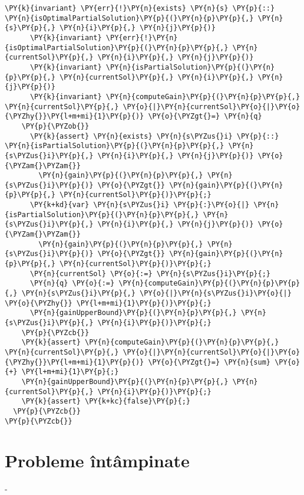 \begin{sloppypar}
\begin{enumerate}
\begin{Verbatim}[commandchars=\\\{\}]
      \PY{k}{invariant} \PY{err}{!}\PY{n}{exists} \PY{n}{s} \PY{p}{::} \PY{n}{isOptimalPartialSolution}\PY{p}{(}\PY{n}{p}\PY{p}{,} \PY{n}{s}\PY{p}{,} \PY{n}{i}\PY{p}{,} \PY{n}{j}\PY{p}{)}
      \PY{k}{invariant} \PY{err}{!}\PY{n}{isOptimalPartialSolution}\PY{p}{(}\PY{n}{p}\PY{p}{,} \PY{n}{currentSol}\PY{p}{,} \PY{n}{i}\PY{p}{,} \PY{n}{j}\PY{p}{)}
      \PY{k}{invariant} \PY{n}{isPartialSolution}\PY{p}{(}\PY{n}{p}\PY{p}{,} \PY{n}{currentSol}\PY{p}{,} \PY{n}{i}\PY{p}{,} \PY{n}{j}\PY{p}{)}
      \PY{k}{invariant} \PY{n}{computeGain}\PY{p}{(}\PY{n}{p}\PY{p}{,} \PY{n}{currentSol}\PY{p}{,} \PY{o}{|}\PY{n}{currentSol}\PY{o}{|}\PY{o}{\PYZhy{}}\PY{l+m+mi}{1}\PY{p}{)} \PY{o}{\PYZgt{}=} \PY{n}{q}
    \PY{p}{\PYZob{}}
      \PY{k}{assert} \PY{n}{exists} \PY{n}{s\PYZus{}i} \PY{p}{::} \PY{n}{isPartialSolution}\PY{p}{(}\PY{n}{p}\PY{p}{,} \PY{n}{s\PYZus{}i}\PY{p}{,} \PY{n}{i}\PY{p}{,} \PY{n}{j}\PY{p}{)} \PY{o}{\PYZam{}\PYZam{}} 
        \PY{n}{gain}\PY{p}{(}\PY{n}{p}\PY{p}{,} \PY{n}{s\PYZus{}i}\PY{p}{)} \PY{o}{\PYZgt{}} \PY{n}{gain}\PY{p}{(}\PY{n}{p}\PY{p}{,} \PY{n}{currentSol}\PY{p}{)}\PY{p}{;}
      \PY{k+kd}{var} \PY{n}{s\PYZus{}i} \PY{p}{:}\PY{o}{|} \PY{n}{isPartialSolution}\PY{p}{(}\PY{n}{p}\PY{p}{,} \PY{n}{s\PYZus{}i}\PY{p}{,} \PY{n}{i}\PY{p}{,} \PY{n}{j}\PY{p}{)} \PY{o}{\PYZam{}\PYZam{}} 
        \PY{n}{gain}\PY{p}{(}\PY{n}{p}\PY{p}{,} \PY{n}{s\PYZus{}i}\PY{p}{)} \PY{o}{\PYZgt{}} \PY{n}{gain}\PY{p}{(}\PY{n}{p}\PY{p}{,} \PY{n}{currentSol}\PY{p}{)}\PY{p}{;}
      \PY{n}{currentSol} \PY{o}{:=} \PY{n}{s\PYZus{}i}\PY{p}{;}
      \PY{n}{q} \PY{o}{:=} \PY{n}{computeGain}\PY{p}{(}\PY{n}{p}\PY{p}{,} \PY{n}{s\PYZus{}i}\PY{p}{,} \PY{o}{|}\PY{n}{s\PYZus{}i}\PY{o}{|} \PY{o}{\PYZhy{}} \PY{l+m+mi}{1}\PY{p}{)}\PY{p}{;}
      \PY{n}{gainUpperBound}\PY{p}{(}\PY{n}{p}\PY{p}{,} \PY{n}{s\PYZus{}i}\PY{p}{,} \PY{n}{i}\PY{p}{)}\PY{p}{;}
    \PY{p}{\PYZcb{}}
    \PY{k}{assert} \PY{n}{computeGain}\PY{p}{(}\PY{n}{p}\PY{p}{,} \PY{n}{currentSol}\PY{p}{,} \PY{o}{|}\PY{n}{currentSol}\PY{o}{|}\PY{o}{\PYZhy{}}\PY{l+m+mi}{1}\PY{p}{)} \PY{o}{\PYZgt{}=} \PY{n}{sum} \PY{o}{+} \PY{l+m+mi}{1}\PY{p}{;}
    \PY{n}{gainUpperBound}\PY{p}{(}\PY{n}{p}\PY{p}{,} \PY{n}{currentSol}\PY{p}{,} \PY{n}{i}\PY{p}{)}\PY{p}{;}
    \PY{k}{assert} \PY{k+kc}{false}\PY{p}{;}
  \PY{p}{\PYZcb{}}
\PY{p}{\PYZcb{}}
\end{Verbatim}

\end{enumerate}

\section{Probleme întâmpinate}

-

\end{sloppypar}
